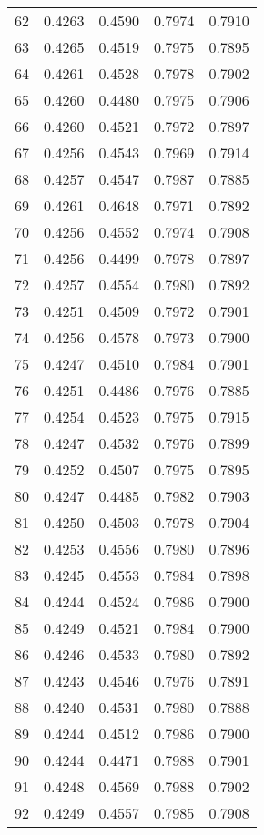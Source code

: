 \documentclass{article}
\begin{document}
\begin{longtable}{c c c c c}
    62 & 0.4263 & 0.4590 & 0.7974 & 0.7910 \\
    63 & 0.4265 & 0.4519 & 0.7975 & 0.7895 \\
    64 & 0.4261 & 0.4528 & 0.7978 & 0.7902 \\
    65 & 0.4260 & 0.4480 & 0.7975 & 0.7906 \\
    66 & 0.4260 & 0.4521 & 0.7972 & 0.7897 \\
    67 & 0.4256 & 0.4543 & 0.7969 & 0.7914 \\
    68 & 0.4257 & 0.4547 & 0.7987 & 0.7885 \\
    69 & 0.4261 & 0.4648 & 0.7971 & 0.7892 \\
    70 & 0.4256 & 0.4552 & 0.7974 & 0.7908 \\
    71 & 0.4256 & 0.4499 & 0.7978 & 0.7897 \\
    72 & 0.4257 & 0.4554 & 0.7980 & 0.7892 \\
    73 & 0.4251 & 0.4509 & 0.7972 & 0.7901 \\
    74 & 0.4256 & 0.4578 & 0.7973 & 0.7900 \\
    75 & 0.4247 & 0.4510 & 0.7984 & 0.7901 \\
    76 & 0.4251 & 0.4486 & 0.7976 & 0.7885 \\
    77 & 0.4254 & 0.4523 & 0.7975 & 0.7915 \\
    78 & 0.4247 & 0.4532 & 0.7976 & 0.7899 \\
    79 & 0.4252 & 0.4507 & 0.7975 & 0.7895 \\
    80 & 0.4247 & 0.4485 & 0.7982 & 0.7903 \\
    81 & 0.4250 & 0.4503 & 0.7978 & 0.7904 \\
    82 & 0.4253 & 0.4556 & 0.7980 & 0.7896 \\
    83 & 0.4245 & 0.4553 & 0.7984 & 0.7898 \\
    84 & 0.4244 & 0.4524 & 0.7986 & 0.7900 \\
    85 & 0.4249 & 0.4521 & 0.7984 & 0.7900 \\
    86 & 0.4246 & 0.4533 & 0.7980 & 0.7892 \\
    87 & 0.4243 & 0.4546 & 0.7976 & 0.7891 \\
    88 & 0.4240 & 0.4531 & 0.7980 & 0.7888 \\
    89 & 0.4244 & 0.4512 & 0.7986 & 0.7900 \\
    90 & 0.4244 & 0.4471 & 0.7988 & 0.7901 \\
    91 & 0.4248 & 0.4569 & 0.7988 & 0.7902 \\
    92 & 0.4249 & 0.4557 & 0.7985 & 0.7908 \\

\end{longtable}
\end{document}
